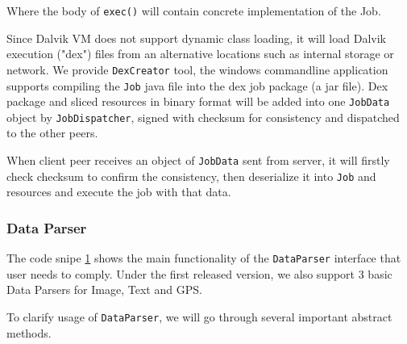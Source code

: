 \documentclass[conference]{IEEEtran}
\begin{document}
Where the body of \texttt{exec()} will contain concrete implementation of the Job.

Since Dalvik VM does not support dynamic class loading, it will load Dalvik execution ("dex") files from an alternative locations such as internal storage or network. We provide \texttt{DexCreator} tool, the windows commandline application supports compiling the \texttt{Job} java file into the dex job package (a jar file). Dex package and sliced resources in binary format will be added into one \texttt{JobData} object by \texttt{JobDispatcher}, signed with checksum for consistency and dispatched to the other peers.

When client peer receives an object of \texttt{JobData} sent from server, it will firstly check checksum to confirm the consistency, then deserialize it into \texttt{Job} and resources and execute the job with that data.

\subsubsection{Data Parser}
The code snipe \ref{data_parser} shows the main functionality of the \texttt{DataParser} interface that user needs to comply. Under the first released version, we also support 3 basic Data Parsers for Image, Text and GPS.\\

\begin{figure}
\noindent {}	
  \label{data_parser}
\end{figure}

To clarify usage of \texttt{DataParser}, we will go through several important abstract methods.
\end{document}
